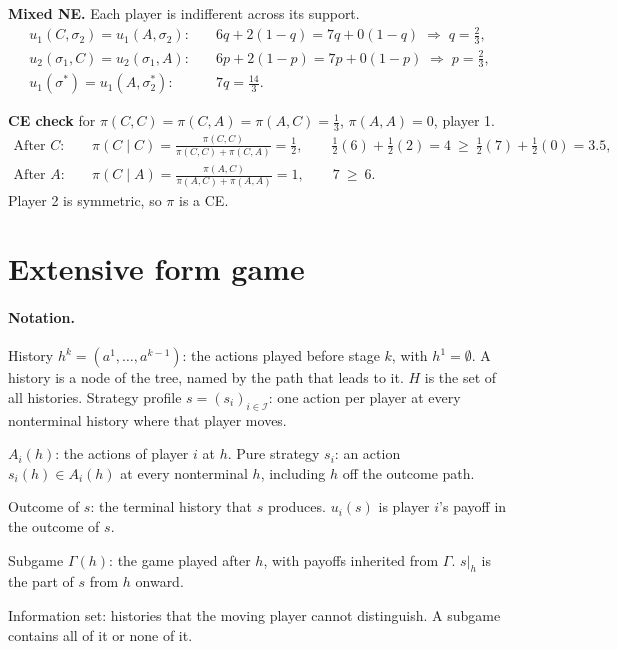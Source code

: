 \documentclass{article}
\begin{document}
\textbf{Mixed NE.} Each player is indifferent across its support.
\begin{align*}
    u_1(C,\sigma_2)=u_1(A,\sigma_2):&\quad 6q+2(1-q)=7q+0(1-q)\;\Rightarrow\;q=\tfrac23,\\
    u_2(\sigma_1,C)=u_2(\sigma_1,A):&\quad 6p+2(1-p)=7p+0(1-p)\;\Rightarrow\;p=\tfrac23,\\
    u_1(\sigma^*)=u_1(A,\sigma_2^*):&\quad 7q=\tfrac{14}{3}.
\end{align*}

\textbf{CE check} for $\pi(C,C)=\pi(C,A)=\pi(A,C)=\tfrac13$, $\pi(A,A)=0$, player 1.
\begin{align*}
    \text{After }C:&\quad \pi(C\mid C)=\frac{\pi(C,C)}{\pi(C,C)+\pi(C,A)}=\tfrac12,\qquad \tfrac12(6)+\tfrac12(2)=4\ \ge\ \tfrac12(7)+\tfrac12(0)=3.5,\\
    \text{After }A:&\quad \pi(C\mid A)=\frac{\pi(A,C)}{\pi(A,C)+\pi(A,A)}=1,\qquad 7\ \ge\ 6.
\end{align*}
Player 2 is symmetric, so $\pi$ is a CE.

\section{Extensive form game}

\paragraph{Notation.}
History $h^k=(a^1,\dots,a^{k-1})$: the actions played before stage $k$, with $h^1=\emptyset$.
A history is a node of the tree, named by the path that leads to it.
$H$ is the set of all histories.
Strategy profile $s=(s_i)_{i\in\mathcal I}$: one action per player at every nonterminal history where that player moves.

$A_i(h)$: the actions of player $i$ at $h$.
Pure strategy $s_i$: an action $s_i(h)\in A_i(h)$ at every nonterminal $h$, including $h$ off the outcome path.

Outcome of $s$: the terminal history that $s$ produces. $u_i(s)$ is player $i$'s payoff in the outcome of $s$.

Subgame $\Gamma(h)$: the game played after $h$, with payoffs inherited from $\Gamma$. $s\vert_h$ is the part of $s$ from $h$ onward.

Information set: histories that the moving player cannot distinguish. A subgame contains all of it or none of it.
\end{document}
